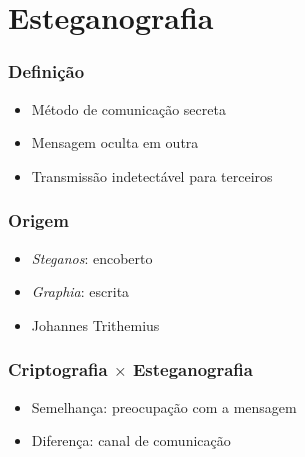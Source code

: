 \documentclass{beamer}
\begin{document}
\section{Esteganografia}

\begin{frame}
\frametitle{Definição}
\begin{itemize}
\item Método de comunicação secreta \newline
\item Mensagem oculta em outra \newline
\item Transmissão indetectável para terceiros


\end{itemize}
\end{frame}

\begin{frame}
\frametitle{Origem}
\begin{itemize}
\item \textit{Steganos}: encoberto \newline
\item \textit{Graphia}: escrita\newline
\item Johannes Trithemius 
\end{itemize}
\end{frame}

\begin{frame}
\frametitle{Criptografia $\times$ Esteganografia}
\begin{itemize}
\item Semelhança: preocupação com a mensagem \newline
\item Diferença: canal de comunicação
\end{itemize}
\end{frame}
\end{document}

